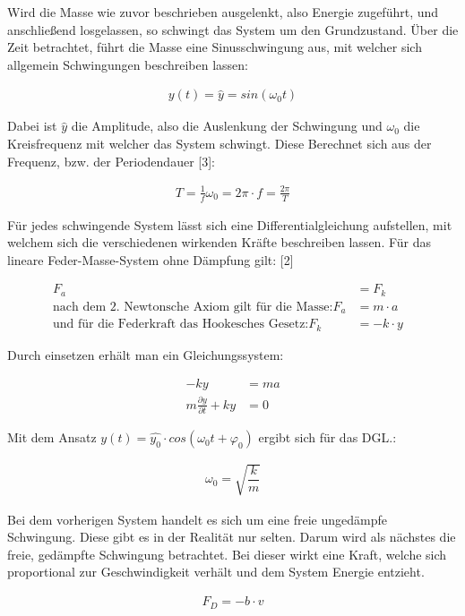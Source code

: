 \documentclass[a4paper]{scrartcl}
\numberwithin{equation}{subsection}
\begin{document}
Wird die Masse wie zuvor beschrieben ausgelenkt, also Energie zugeführt, und anschließend losgelassen, so schwingt das System um den Grundzustand. 
Über die Zeit betrachtet, führt die Masse eine Sinusschwingung aus, mit welcher sich allgemein Schwingungen beschreiben lassen:

\begin{align}
y(t) = \widehat{y} = sin(\omega_0 t )
\end{align}


Dabei ist $\widehat{y}$ die Amplitude, also die Auslenkung der Schwingung und $\omega_0$ die Kreisfrequenz mit welcher das System schwingt. 
Diese Berechnet sich aus der Frequenz, bzw. der Periodendauer [3]:

\begin{align}
T = \frac{1}{f}
\omega_0 = 2\pi \cdot f = \frac{2\pi}{T}
\end{align}

Für jedes schwingende System lässt sich eine Differentialgleichung aufstellen, mit welchem sich die verschiedenen wirkenden Kräfte beschreiben lassen. Für das lineare Feder-Masse-System ohne Dämpfung gilt: [2]

\begin{align}
F_a &= F_k &\\
\text{nach dem 2. Newtonsche Axiom gilt für die Masse:} F_a &= m \cdot a &\\
\text{und für die Federkraft das Hookesches Gesetz:} F_k &= -k \cdot y &
\end{align}

Durch einsetzen erhält man ein Gleichungssystem:

\begin{align}
-ky &= ma \\
m \frac{\partial y}{\partial t} + ky &= 0
\end{align}

Mit dem Ansatz $y(t) = \widehat{y_0} \cdot cos(\omega_0 t + \varphi_0)$ ergibt sich für das DGL.:

\begin{align}
\omega_0 = \sqrt{\dfrac{k}{m}}
\end{align}

Bei dem vorherigen System handelt es sich um eine freie ungedämpfe Schwingung. Diese gibt es in der Realität nur selten. Darum wird als nächstes die freie, gedämpfte Schwingung betrachtet.
Bei dieser wirkt eine Kraft, welche sich proportional zur Geschwindigkeit verhält und dem System Energie entzieht.

\begin{align}
F_D = -b \cdot v
\end{align}
\end{document}
